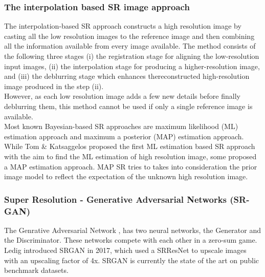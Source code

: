 \documentclass[10pt,twocolumn,letterpaper]{article}
\begin{document}
\subsubsection{The interpolation based SR image approach}
\hspace*{0.167 in} The interpolation-based SR approach constructs a high resolution image by casting all the low resolution images to the reference image and then combining all the information available from every image available.
The method consists of the following three stages
(i) the registration stage for aligning the low-resolution input images,
(ii) the interpolation stage for producing a higher-resolution image, and
(iii) the deblurring stage which enhances thereconstructed high-resolution image produced in the step (ii). \\
\hspace*{0.167 in}However, as each low resolution image adds a few new details before finally deblurring them, this method cannot be used if only a single reference image is available.\\
\hspace*{0.167 in} Most known Bayesian-based SR approaches are maximum likelihood (ML) estimation approach  and maximum a posterior (MAP) estimation approach. While Tom \& Katsaggelos \cite{Brian1996ML} proposed the first ML estimation based SR approach with the aim to find the ML estimation of high resolution image, some proposed a MAP estimation approach. MAP SR tries to takes into consideration the prior image model to reflect the expectation of the unknown high resolution image.
\subsubsection{Super Resolution - Generative Adversarial Networks (SR-GAN)}
\hspace*{0.167 in} The Genrative Adversarial Network \cite{goodfellow2014generative}, has two neural networks, the Generator and the Discriminator. These networks compete with each other in a zero-sum game.
Ledig \etal\cite{ledig2017photorealistic} introduced SRGAN in 2017, which used a SRResNet to upscale images with an upscaling factor of 4x. SRGAN is currently the state of the art on public benchmark datasets.
\end{document}
